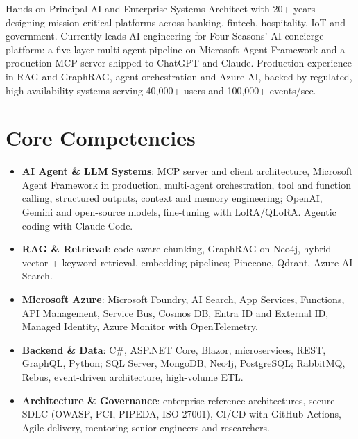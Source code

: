 \documentclass[11pt,a4paper,sans]{moderncv}
\begin{document}
\makecvtitle


\vspace{6pt}
\small{Hands-on Principal AI and Enterprise Systems Architect with 20+ years designing mission-critical platforms across banking, fintech, hospitality, IoT and government. Currently leads AI engineering for Four Seasons' AI concierge platform: a five-layer multi-agent pipeline on Microsoft Agent Framework and a production MCP server shipped to ChatGPT and Claude. Production experience in RAG and GraphRAG, agent orchestration and Azure AI, backed by regulated, high-availability systems serving 40,000+ users and 100,000+ events/sec.}


\section{Core Competencies}
\vspace{1pt}
\begin{itemize}

\item \textbf{AI Agent \& LLM Systems}: MCP server and client architecture, Microsoft Agent Framework in production, multi-agent orchestration, tool and function calling, structured outputs, context and memory engineering; OpenAI, Gemini and open-source models, fine-tuning with LoRA/QLoRA. Agentic coding with Claude Code.

\item \textbf{RAG \& Retrieval}: code-aware chunking, GraphRAG on Neo4j, hybrid vector + keyword retrieval, embedding pipelines; Pinecone, Qdrant, Azure AI Search.

\item \textbf{Microsoft Azure}: Microsoft Foundry, AI Search, App Services, Functions, API Management, Service Bus, Cosmos DB, Entra ID and External ID, Managed Identity, Azure Monitor with OpenTelemetry.

\item \textbf{Backend \& Data}: C\#, ASP.NET Core, Blazor, microservices, REST, GraphQL, Python; SQL Server, MongoDB, Neo4j, PostgreSQL; RabbitMQ, Rebus, event-driven architecture, high-volume ETL.

\item \textbf{Architecture \& Governance}: enterprise reference architectures, secure SDLC (OWASP, PCI, PIPEDA, ISO 27001), CI/CD with GitHub Actions, Agile delivery, mentoring senior engineers and researchers.

\end{itemize}
\end{document}
